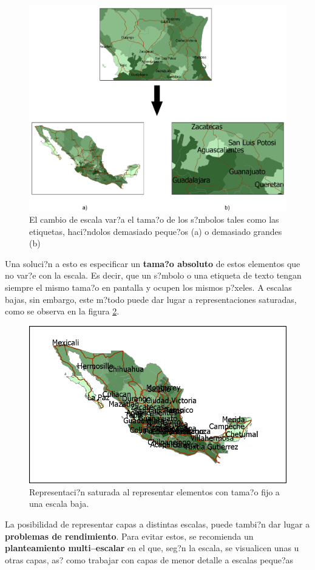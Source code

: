\begin{figure}[!hbt]
\centering
\includegraphics[width=\columnwidth]{../es/Visualizacion/ProblemasRepresentacionSimbolos.pdf}
\caption{\small El cambio de escala var?a el tama?o de los s?mbolos tales como las etiquetas, haci?ndolos demasiado peque?os (a) o demasiado grandes (b)}
\label{Fig:ProblemasRepresentacionSimbolos} 
\end{figure}


Una soluci?n a esto es especificar un \textbf{tama?o absoluto} de estos elementos que no var?e con la escala. Es decir, que un s?mbolo o una etiqueta de texto tengan siempre el mismo tama?o en pantalla y ocupen los mismos p?xeles. A escalas bajas, sin embargo, este m?todo puede dar lugar a representaciones saturadas, como se observa en la figura \ref{Fig:RepresentacionSaturada}.

\begin{figure}[!hbt]
\centering
\includegraphics[width=.9\columnwidth]{../es/Visualizacion/RepresentacionSaturada.png}
\caption{\small Representaci?n saturada al representar elementos con tama?o fijo a una escala baja.}
\label{Fig:RepresentacionSaturada} 
\end{figure}

La posibilidad de representar capas a distintas escalas, puede tambi?n dar lugar a \textbf{problemas de rendimiento}. Para evitar estos, se recomienda un \textbf{planteamiento multi--escalar} en el que, seg?n la escala, se visualicen unas u otras capas, as? como trabajar con capas de menor detalle a escalas peque?as

\pagestyle{empty}

